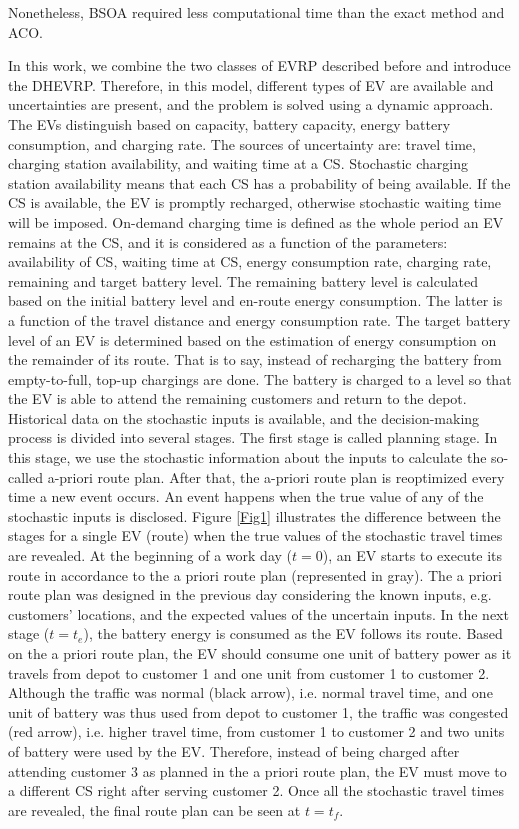 \documentclass[11pt]{article}
\begin{document}
Nonetheless, BSOA required less computational time than the exact method and ACO. 



In this work, we combine the two classes of EVRP described before and introduce the DHEVRP. Therefore, in this model, different types of EV are available and uncertainties are present, and the problem is solved using a dynamic approach. The EVs distinguish based on capacity, battery capacity, energy battery consumption, and charging rate. The sources of uncertainty are: travel time, charging station availability, and waiting time at a CS. Stochastic charging station availability means that each CS has a probability of being available. If the CS is available, the EV is promptly recharged, otherwise stochastic waiting time will be imposed. On-demand charging time is defined as the whole period an EV remains at the CS, and it is considered as a function of the parameters: availability of CS, waiting time at CS, energy consumption rate, charging rate, remaining and target battery level. The remaining battery level is calculated based on the initial battery level and en-route energy consumption. The latter is a function of the travel distance and energy consumption rate. The target battery level of an EV is determined based on the estimation of energy consumption on the remainder of its route. That is to say, instead of recharging the battery from empty-to-full, top-up chargings are done. The battery is charged to a level so that the EV is able to attend the remaining customers and return to the depot. Historical data on the stochastic inputs is available, and the decision-making process is divided into several stages. The first stage is called planning stage. In this stage, we use the stochastic information about the inputs to calculate the so-called a-priori route plan. After that, the a-priori route plan is reoptimized every time a new event occurs. An event happens when the true value of any of the stochastic inputs is disclosed. Figure \ref{Fig1} illustrates the difference between the stages for a single EV (route) when the true values of the stochastic travel times are revealed. At the beginning of a work day ($t = 0$), an EV starts to execute its route in accordance to the a priori route plan (represented in gray). The a priori route plan was designed in the previous day considering the known inputs, e.g. customers' locations, and the expected values of the uncertain inputs. In the next stage ($t = t_e$), the battery energy is consumed as the EV follows its route. Based on the a priori route plan, the EV should consume one unit of battery power as it travels from depot to customer 1 and one unit from customer 1 to customer 2. Although the traffic was normal (black arrow), i.e. normal travel time, and one unit of battery was thus used from depot to customer 1, the traffic was congested (red arrow), i.e. higher travel time, from customer 1 to customer 2 and two units of battery were used by the EV. Therefore, instead of being charged after attending customer 3 as planned in the a priori route plan, the EV must move to a different CS right after serving customer 2. Once all the stochastic travel times are revealed, the final route plan can be seen at $t = t_f$.
\end{document}
